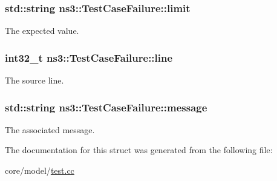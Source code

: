 \subsubsection[{\texorpdfstring{limit}{limit}}]{\setlength{\rightskip}{0pt plus 5cm}std\+::string ns3\+::\+Test\+Case\+Failure\+::limit}\hypertarget{structns3_1_1TestCaseFailure_adfcc28f97df7dce78629ee21d11e1f41}{}\label{structns3_1_1TestCaseFailure_adfcc28f97df7dce78629ee21d11e1f41}
The expected value. 
\subsubsection[{\texorpdfstring{line}{line}}]{\setlength{\rightskip}{0pt plus 5cm}int32\+\_\+t ns3\+::\+Test\+Case\+Failure\+::line}\hypertarget{structns3_1_1TestCaseFailure_a49a39a3dea2bc673abf2fedf78f67ebe}{}\label{structns3_1_1TestCaseFailure_a49a39a3dea2bc673abf2fedf78f67ebe}
The source line. 
\subsubsection[{\texorpdfstring{message}{message}}]{\setlength{\rightskip}{0pt plus 5cm}std\+::string ns3\+::\+Test\+Case\+Failure\+::message}\hypertarget{structns3_1_1TestCaseFailure_a293e13164cefcd1f8758eada2018fa0d}{}\label{structns3_1_1TestCaseFailure_a293e13164cefcd1f8758eada2018fa0d}
The associated message. 

The documentation for this struct was generated from the following file\+:\begin{DoxyCompactItemize}
\item 
core/model/\hyperlink{test_8cc}{test.\+cc}\end{DoxyCompactItemize}
